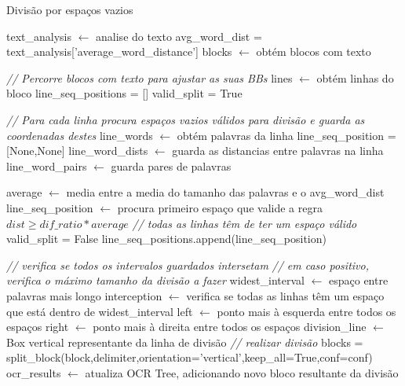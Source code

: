 \begin{breakablealgorithm}
	\caption{Divisão por espaços vazios}
	\footnotesize
	\begin{algorithmic}[1]
		
		\State text\_analysis $\leftarrow$ analise do texto
		\State avg\_word\_dist = text\_analysis['average\_word\_distance']
		\State blocks $\leftarrow$ obtém blocos com texto
		
		\State \textit{// Percorre blocos com texto para ajustar as suas BBs}
			\State lines $\leftarrow$ obtém linhas do bloco
			\State line\_seq\_positions = [] 
			\State valid\_split = True
			
			\State \textit{// Para cada linha procura espaços vazios válidos para divisão e guarda as coordenadas destes}
				\State line\_words $\leftarrow$ obtém palavras da linha
				\State line\_seq\_position = [None,None]
				\State line\_word\_dists $\leftarrow$ guarda as distancias entre palavras na linha
				\State line\_word\_pairs $\leftarrow$ guarda pares de palavras
				
					\State average $\leftarrow$ media entre a media do tamanho das palavras e o avg\_word\_dist
					\State line\_seq\_position $\leftarrow$ procura primeiro espaço que valide a regra $ dist \geq dif\_ratio * average$
						\State \textit{// todas as linhas têm de ter um espaço válido}
						\State valid\_split = False
					\Else
						\State line\_seq\_positions.append(line\_seq\_position)
					\EndIf
				\EndIf
				
			\EndFor
			
				\State \textit{// verifica se todos os intervalos guardados intersetam}
				\State \textit{// em caso positivo, verifica o máximo tamanho da divisão a fazer}
				\State widest\_interval $\leftarrow$ espaço entre palavras mais longo
				\State interception $\leftarrow$ verifica se todas as linhas têm um espaço que está dentro de widest\_interval
					\State left $\leftarrow$ ponto mais à esquerda entre todos os espaços
					\State right $\leftarrow$ ponto mais à direita entre todos os espaços
					\State division\_line $\leftarrow$ Box vertical representante da linha de divisão
					\State \textit{// realizar divisão}
					\State blocks =  split\_block(block,delimiter,orientation='vertical',keep\_all=True,conf=conf)
					\State ocr\_results $\leftarrow$ atualiza OCR Tree, adicionando novo bloco resultante da divisão
				\EndIf
			\EndIf
		\EndFor
		
		
	\end{algorithmic}
\end{breakablealgorithm}



